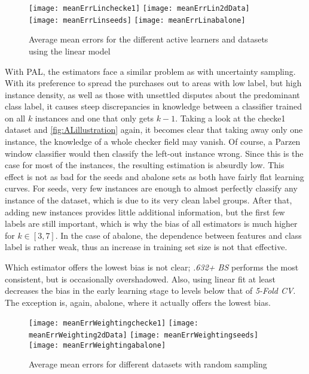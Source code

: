 \begin{figure}[h]
	\centering
	\texttt{[image: meanErrLinchecke1]}
	\texttt{[image: meanErrLin2dData]}
	\texttt{[image: meanErrLinseeds]}
	\texttt{[image: meanErrLinabalone]}
	\caption{Average mean errors for the different active learners and datasets using the linear model}
	\label{fig:meanErrorsLin}
\end{figure}

With PAL, the estimators face a similar problem as with uncertainty sampling. With its preference to spread the purchases out to areas with low label, but high instance density, as well as those with unsettled disputes about the predominant class label, it causes steep discrepancies in knowledge between a classifier trained on all $k$ instances and one that only gets $k-1$. Taking a look at the checke1 dataset and \ref{fig:ALillustration} again, it becomes clear that taking away only one instance, the knowledge of a whole checker field may vanish. Of course, a Parzen window classifier would then classify the left-out instance wrong. Since this is the case for most of the instances, the resulting estimation is absurdly low. This effect is not as bad for the seeds and abalone sets as both have fairly flat learning curves. For seeds, very few instances are enough to almost perfectly classify any instance of the dataset, which is due to its very clean label groups. After that, adding new instances provides little additional information, but the first few labels are still important, which is why the bias of all estimators is much higher for $k \in [3,7]$. In the case of abalone, the dependence between features and class label is rather weak, thus an increase in training set size is not that effective.

Which estimator offers the lowest bias is not clear; \textit{.632+ BS} performs the most consistent, but is occasionally overshadowed. Also, using linear fit at least decreases the bias in the early learning stage to levels below that of \textit{5-Fold CV}. The exception is, again, abalone, where it actually offers the lowest bias.

\begin{figure}[h]
	\centering
	\texttt{[image: meanErrWeightingchecke1]}
	\texttt{[image: meanErrWeighting2dData]}
	\texttt{[image: meanErrWeightingseeds]}
	\texttt{[image: meanErrWeightingabalone]}
	\caption{Average mean errors for different datasets with random sampling}
	\label{fig:meanErrorsWeighted}
\end{figure}

